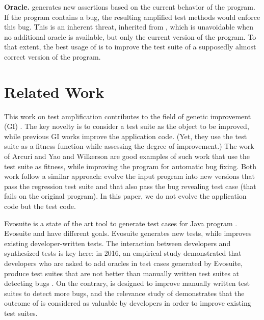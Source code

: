 \textbf{Oracle.}
\dspot generates new assertions based on the current behavior of the program. If the program contains a bug, the resulting amplified test methods would enforce this bug. This is an inherent threat, inherited from \cite{Xie2006}, which is unavoidable when no additional oracle is available, but only the current version of the program. 
To that extent, the best usage of \dspot is to improve the test suite of a supposedly almost correct version of the program.



\section{Related Work}
\label{sec:related}

This work on test amplification  contributes to the field of genetic improvement (GI)  \cite{petke2017genetic}. 
The key novelty is to consider a test suite as the object to be improved, while previous GI works improve the application code.
(Yet, they use the test suite as a fitness function while  assessing the degree of improvement.) The work of Arcuri and Yao \cite{arcuri2008novel} and Wilkerson \etal \cite{wilkerson2010coevolutionary} are good examples of such work that use the test suite as fitness, while improving the program for automatic bug fixing. Both work follow a similar approach: evolve the input program into new versions that pass the regression test suite and that also pass the bug revealing test case (that fails on the original program). In this paper, we do not evolve the application code but the test code.

Evosuite is a state of the art tool to generate test cases for Java program \cite{fraser2013whole}. Evosuite and \dspot have different goals. Evosuite generates new tests, while \dspot improves existing developer-written tests. The interaction between developers and synthesized tests is key here: in 2016, an empirical study demonstrated that developers who are asked to add oracles in test cases generated by Evosuite, produce test suites that are not better than manually written test suites at detecting bugs \cite{fraser2015does}. On the contrary, \dspot is designed to improve manually written test suites to detect more bugs, and  the relevance study of \rqpullrequest demonstrates that the outcome of \dspot is considered as valuable by developers in order to improve existing test suites. 

